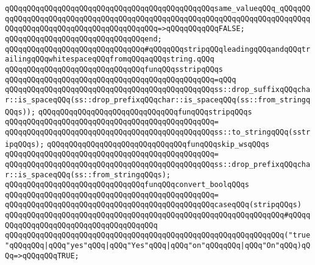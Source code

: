 \verb|qQQqqQQqqQQqqQQqqQQqqQQqqQQqqQQqqQQqqQQqqQQqqQQqsame_valueqQQq_qQQqqQQqqQQqqQQqqQQqqQQqqQQqqQQqqQQqqQQqqQQqqQQqqQQqqQQqqQQqqQQqqQQqqQQqqQQqqQQqqQQqqQQqqQQqqQQqqQQqqQQqqQQqqQQq=>qQQqqQQqqQQqFALSE;|\newline
\verb|qQQqqQQqqQQqqQQqqQQqqQQqqQQqqQQqend;|\newline
\newline
\verb|qQQqqQQqqQQqqQQqqQQqqQQqqQQqqQQq#qQQqqQQqstripqQQqleadingqQQqandqQQqtrailingqQQqwhitespaceqQQqfromqQQqaqQQqstring.qQQq|\newline
\newline
\verb|qQQqqQQqqQQqqQQqqQQqqQQqqQQqqQQqfunqQQqsstripqQQqs|\newline
\verb|qQQqqQQqqQQqqQQqqQQqqQQqqQQqqQQqqQQqqQQqqQQqqQQq=qQQq|\newline
\verb|qQQqqQQqqQQqqQQqqQQqqQQqqQQqqQQqqQQqqQQqqQQqqQQqss::drop_suffixqQQqchar::is_spaceqQQq(ss::drop_prefixqQQqchar::is_spaceqQQq(ss::from_stringqQQqs));|\newline
\newline
\verb|qQQqqQQqqQQqqQQqqQQqqQQqqQQqqQQqfunqQQqstripqQQqs|\newline
\verb|qQQqqQQqqQQqqQQqqQQqqQQqqQQqqQQqqQQqqQQqqQQqqQQq=|\newline
\verb|qQQqqQQqqQQqqQQqqQQqqQQqqQQqqQQqqQQqqQQqqQQqqQQqss::to_stringqQQq(sstripqQQqs);|\newline
\newline
\verb|qQQqqQQqqQQqqQQqqQQqqQQqqQQqqQQqfunqQQqskip_wsqQQqs|\newline
\verb|qQQqqQQqqQQqqQQqqQQqqQQqqQQqqQQqqQQqqQQqqQQqqQQq=|\newline
\verb|qQQqqQQqqQQqqQQqqQQqqQQqqQQqqQQqqQQqqQQqqQQqqQQqss::drop_prefixqQQqchar::is_spaceqQQq(ss::from_stringqQQqs);|\newline
\newline
\verb|qQQqqQQqqQQqqQQqqQQqqQQqqQQqqQQqfunqQQqconvert_boolqQQqs|\newline
\verb|qQQqqQQqqQQqqQQqqQQqqQQqqQQqqQQqqQQqqQQqqQQqqQQq=|\newline
\verb|qQQqqQQqqQQqqQQqqQQqqQQqqQQqqQQqqQQqqQQqqQQqqQQqcaseqQQq(stripqQQqs)|\newline
\verb|qQQqqQQqqQQqqQQqqQQqqQQqqQQqqQQqqQQqqQQqqQQqqQQqqQQqqQQqqQQqqQQq#qQQqqQQqqQQqqQQqqQQqqQQqqQQqqQQqqQQqqQQq|\newline
\verb|qQQqqQQqqQQqqQQqqQQqqQQqqQQqqQQqqQQqqQQqqQQqqQQqqQQqqQQqqQQqqQQq("true"qQQqqQQq|\verb#|qQQq"yes"qQQq|qQQq"Yes"qQQq|qQQq"on"qQQqqQQq|qQQq"On"qQQq)qQQq=>qQQqqQQqTRUE;#\newline
